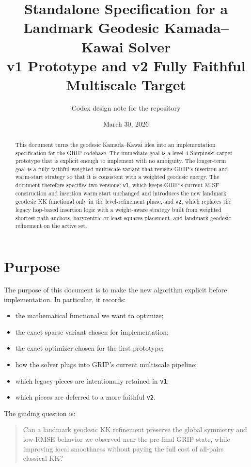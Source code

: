 \documentclass[11pt]{article}
\title{Standalone Specification for a Landmark Geodesic Kamada--Kawai Solver\\
\large v1 Prototype and v2 Fully Faithful Multiscale Target}
\author{Codex design note for the \filepath{<repo-root>} repository}
\date{March 30, 2026}
\newcommand{\code}[1]{\begingroup\urlstyle{tt}\nolinkurl{#1}\endgroup}
\begin{document}
\maketitle

\begin{abstract}
This document turns the geodesic Kamada--Kawai idea into an implementation
specification for the GRIP codebase. The immediate goal is a level-4 Sierpinski
carpet prototype that is explicit enough to implement with no ambiguity. The
longer-term goal is a fully faithful weighted multiscale variant that revisits
GRIP's insertion and warm-start strategy so that it is consistent with a
weighted geodesic energy. The document therefore specifies two versions:
\code{v1}, which keeps GRIP's current MISF construction and insertion warm
start unchanged and introduces the new landmark geodesic KK functional only in
the level-refinement phase, and \code{v2}, which replaces the legacy
hop-based insertion logic with a weight-aware strategy built from weighted
shortest-path anchors, barycentric or least-squares placement, and landmark
geodesic refinement on the active set.
\end{abstract}

\section{Purpose}

The purpose of this document is to make the new algorithm explicit before
implementation. In particular, it records:
\begin{itemize}[leftmargin=1.4em]
  \item the mathematical functional we want to optimize;
  \item the exact sparse variant chosen for implementation;
  \item the exact optimizer chosen for the first prototype;
  \item how the solver plugs into GRIP's current multiscale pipeline;
  \item which legacy pieces are intentionally retained in \code{v1};
  \item which pieces are deferred to a more faithful \code{v2}.
\end{itemize}

The guiding question is:
\begin{quote}
Can a landmark geodesic KK refinement preserve the global symmetry and
low-RMSE behavior we observed near the pre-final GRIP state, while improving
local smoothness without paying the full cost of all-pairs classical KK?
\end{quote}
\end{document}
